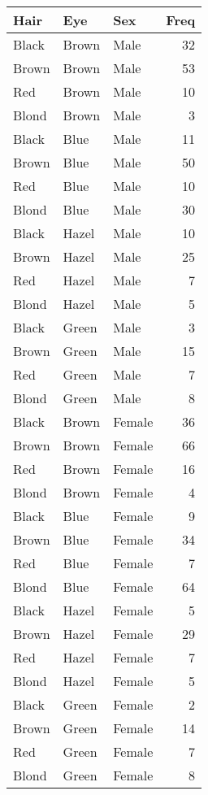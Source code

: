 \documentclass[]{article}
\begin{document}
\begin{tabular}{l|l|l|r}
\hline
Hair & Eye & Sex & Freq\\
\hline
Black & Brown & Male & 32\\
\hline
Brown & Brown & Male & 53\\
\hline
Red & Brown & Male & 10\\
\hline
Blond & Brown & Male & 3\\
\hline
Black & Blue & Male & 11\\
\hline
Brown & Blue & Male & 50\\
\hline
Red & Blue & Male & 10\\
\hline
Blond & Blue & Male & 30\\
\hline
Black & Hazel & Male & 10\\
\hline
Brown & Hazel & Male & 25\\
\hline
Red & Hazel & Male & 7\\
\hline
Blond & Hazel & Male & 5\\
\hline
Black & Green & Male & 3\\
\hline
Brown & Green & Male & 15\\
\hline
Red & Green & Male & 7\\
\hline
Blond & Green & Male & 8\\
\hline
Black & Brown & Female & 36\\
\hline
Brown & Brown & Female & 66\\
\hline
Red & Brown & Female & 16\\
\hline
Blond & Brown & Female & 4\\
\hline
Black & Blue & Female & 9\\
\hline
Brown & Blue & Female & 34\\
\hline
Red & Blue & Female & 7\\
\hline
Blond & Blue & Female & 64\\
\hline
Black & Hazel & Female & 5\\
\hline
Brown & Hazel & Female & 29\\
\hline
Red & Hazel & Female & 7\\
\hline
Blond & Hazel & Female & 5\\
\hline
Black & Green & Female & 2\\
\hline
Brown & Green & Female & 14\\
\hline
Red & Green & Female & 7\\
\hline
Blond & Green & Female & 8\\
\hline
\end{tabular}
\end{document}
